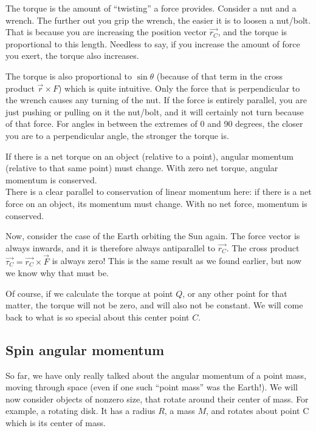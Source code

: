 \documentclass[12pt,a4paper]{report}
\begin{document}
The torque is the amount of ``twisting'' a force provides. Consider a nut and a wrench. The further out you grip the wrench, the easier it is to loosen a nut/bolt. That is because you are increasing the position vector $\vec{r_C}$, and the torque is proportional to this length. Needless to say, if you increase the amount of force you exert, the torque also increases.

The torque is also proportional to $\sin \theta$ (because of that term in the cross product $\vec{r} \times {F}$) which is quite intuitive. Only the force that is perpendicular to the wrench causes any turning of the nut. If the force is entirely parallel, you are just pushing or pulling on it the nut/bolt, and it will certainly not turn because of that force. For angles in between the extremes of 0 and 90 degrees, the closer you are to a perpendicular angle, the stronger the torque is.

If there is a net torque on an object (relative to a point), angular momentum (relative to that same point) must change. With zero net torque, angular momentum is conserved.\\
There is a clear parallel to conservation of linear momentum here: if there is a net force on an object, its momentum must change. With no net force, momentum is conserved.

Now, consider the case of the Earth orbiting the Sun again. The force vector is always inwards, and it is therefore always antiparallel to $\vec{r_C}$. The cross product $\vec{\tau_C} = \vec{r_C} \times \vec{F}$ is always zero! This is the same result as we found earlier, but now we know why that must be.

Of course, if we calculate the torque at point $Q$, or any other point for that matter, the torque will not be zero, and will also not be constant. We will come back to what is so special about this center point $C$.

\subsection{Spin angular momentum}

So far, we have only really talked about the angular momentum of a point mass, moving through space (even if one such ``point mass'' was the Earth!). We will now consider objects of nonzero size, that rotate around their center of mass. For example, a rotating disk. It has a radius $R$, a mass $M$, and rotates about point C which is its center of mass.
\end{document}
